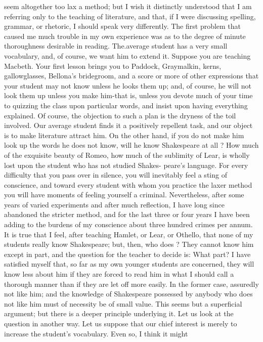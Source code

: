 \documentclass[]{book}
\begin{document}
seem altogether too lax a method; but I wish it distinctly understood
that I am referring only to the teaching of literature, and that, if I
were discussing spelling, grammar, or rhetoric, I should speak very
differently. The first problem that caused me much trouble in my own
experience was as to the degree of minute thoroughness desirable in
reading. The.average student has a very small vocabulary, and, of
course, we want him to extend it. Suppose you are teaching Macbeth. Your
first lesson brings you to Paddock, Graymalkin, kerns, gallowglasses,
Bellona's bridegroom, and a score or more of other expressions that your
student may not know unless he looks them up; and, of course, he will
not look them up unless you make him-that is, unless you devote much of
your time to quizzing the class upon particular words, and insist upon
having everything explained. Of course, the objection to such a plan is
the dryness of the toil involved. Our average student finds it a
positively repellent task, and our object is to make literature attract
him. On the other hand, if you do not make him look up the words he does
not know, will he know Shakespeare at all ? How much of the exquisite
beauty of Romeo, how much of the sublimity of Lear, is wholly lost upon
the student who has not studied Shakes- peare's language. For every
difficulty that you pass over in silence, you will inevitably feel a
sting of conscience, and toward every student with whom you practice the
laxer method you will have moments of feeling yourself a criminal.
Nevertheless, after some years of varied experiments and after much
reflection, I have long since abandoned the stricter method, and for the
last three or four years I have been adding to the burdens of my
conscience about three hundred crimes per annum. It is true that I feel,
after teaching Hamlet, or Lear, or Othello, that none of my students
really know Shakespeare; but, then, who does ? They cannot know him
except in part, and the question for the teacher to decide is: What
part? I have satisfied myself that, so far as my own younger students
are concerned, they will know less about him if they are forced to read
him in what I should call a thorough manner than if they are let off
more easily. In the former case, assuredly not like him; and the
knowledge of Shakespeare possessed by anybody who does not like him must
of necessity be of small value. This seems but a superficial argument;
but there is a deeper principle underlying it. Let us look at the
question in another way. Let us suppose that our chief interest is
merely to increase the student's vocabulary. Even so, I think it might
\end{document}
